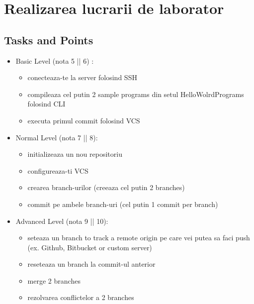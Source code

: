 \section{Realizarea lucrarii de laborator}

\subsection{Tasks and Points}

\begin{itemize}
\item Basic Level (nota 5 || 6) : 
\begin{itemize}

    \item conecteaza-te la server folosind SSH
    \item compileaza cel putin 2 sample programs din setul HelloWolrdPrograms folosind CLI
    \item executa primul commit folosind VCS

\end{itemize}
\item Normal Level (nota 7 || 8):
\begin{itemize}

   \item initializeaza un nou repositoriu
   \item configureaza-ti VCS
   \item crearea branch-urilor (creeaza cel putin 2 branches)
   \item commit pe ambele branch-uri (cel putin 1 commit per branch)

\end{itemize}
\item Advanced Level (nota 9 || 10): 
\begin{itemize}

   \item seteaza un branch to track a remote origin pe care vei putea sa faci push (ex. Github, Bitbucket or custom server)
   \item reseteaza un branch la commit-ul anterior
   \item merge 2 branches
   \item rezolvarea conflictelor a 2 branches

\end{itemize}
\end{itemize}

